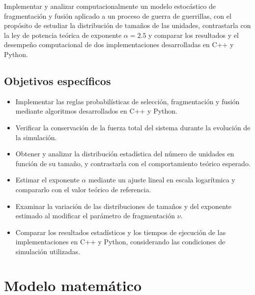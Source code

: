 \documentclass[
a4paper,
amsfonts,
amssymb,
amsmath,
reprint,
twoside
]{revtex4-1}
\begin{document}
Implementar y analizar computacionalmente un modelo estocástico
de fragmentación y fusión aplicado a un proceso de guerra de
guerrillas, con el propósito de estudiar la distribución de tamaños
de las unidades, contrastarla con la ley de potencia teórica de
exponente $\alpha=2.5$ y comparar los resultados y el desempeño
computacional de dos implementaciones desarrolladas en C++ y Python.

\subsection{Objetivos específicos}

\begin{itemize}

    \item Implementar las reglas probabilísticas de selección,
    fragmentación y fusión mediante algoritmos desarrollados
    en C++ y Python.

    \item Verificar la conservación de la fuerza total del sistema
    durante la evolución de la simulación.

    \item Obtener y analizar la distribución estadística del número
    de unidades en función de su tamaño, y contrastarla con el
    comportamiento teórico esperado.

    \item Estimar el exponente $\alpha$ mediante un ajuste lineal
    en escala logarítmica y compararlo con el valor teórico
    de referencia.

    \item Examinar la variación de las distribuciones de tamaños
    y del exponente estimado al modificar el parámetro de
    fragmentación $\nu$.

    \item Comparar los resultados estadísticos y los tiempos de
    ejecución de las implementaciones en C++ y Python,
    considerando las condiciones de simulación utilizadas.

\end{itemize}


\section{Modelo matemático}
\end{document}
